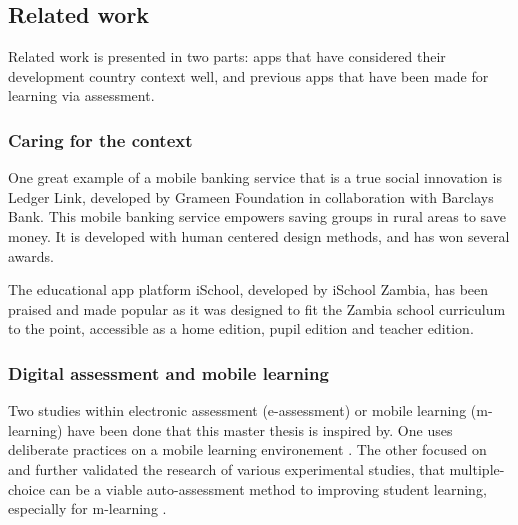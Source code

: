 \subsection{Related work}

Related work is presented in two parts: apps that have considered their development country context well, and previous apps that have been made for learning via assessment.

\subsubsection{Caring for the context}

One great example of a mobile banking service that is a true social innovation is Ledger Link, developed by Grameen Foundation in collaboration with Barclays Bank. This mobile banking service empowers saving groups in rural areas to save money. It is developed with human centered design methods, and has won several awards. \citep{nissar}

The educational app platform iSchool, developed by iSchool Zambia, has been praised and made popular as it was designed to fit the Zambia school curriculum to the point, accessible as a home edition, pupil edition and teacher edition.

\subsubsection{Digital assessment and mobile learning}

Two studies within electronic assessment (e-assessment) or mobile learning (m-learning) have been done that this master thesis is inspired by. One uses deliberate practices on a mobile learning environement \citep{yengin}. The other focused on and further validated the research of various experimental studies, that multiple-choice can be a viable auto-assessment method to improving student learning, especially for m-learning \citep{de-marcos}.
